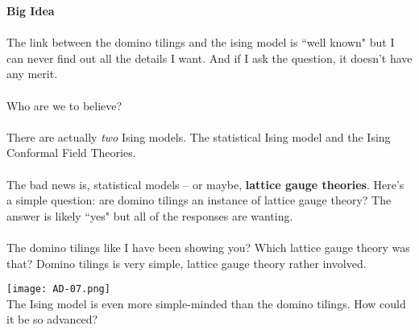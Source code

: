 \documentclass[12pt]{article}
\begin{document}
\noindent \textbf{Big Idea} \\ \\
The link between the domino tilings and the ising model is ``well known" but I can never find out all the details I want.  And if I ask the question, it doesn't have any merit. \\ \\
Who are we to believe?  \\ \\
There are actually \textit{two} Ising models.  The statistical Ising model and the Ising Conformal Field Theories. \\ \\ 
The bad news is, statistical models -- or maybe, \textbf{lattice gauge theories}.  Here's a simple question: {\color{blue!50!green}are domino tilings an instance of lattice gauge theory}? The answer is likely ``yes" but all of the responses are wanting. \\ \\
The domino tilings like I have been showing you?  Which lattice gauge theory was that?  Domino tilings is very simple, lattice gauge theory rather involved.  

\texttt{[image: AD-07.png]} \\
The Ising model is even more simple-minded than the domino tilings.  How could it be so advanced? 

\newpage
\end{document}
